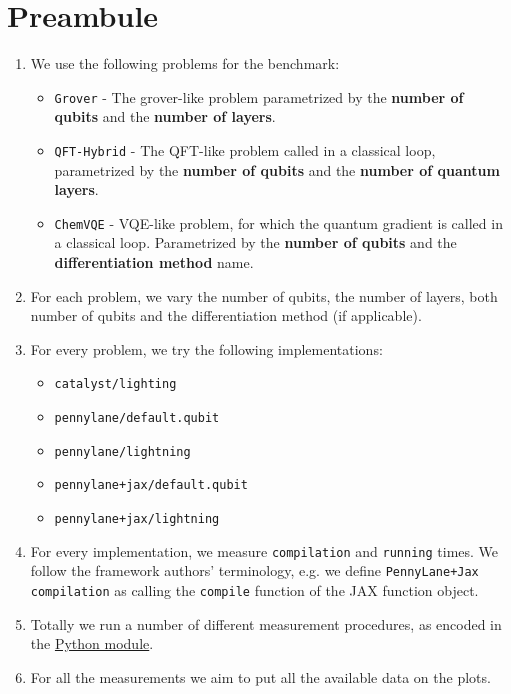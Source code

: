 \documentclass{article}
\renewcommand{\t}[1]{\texttt{#1}}
\begin{document}
\tableofcontents

\section{Preambule}

\begin{enumerate}
    \item We use the following problems for the benchmark:
        \begin{itemize}
            \item \t{Grover} - The grover-like problem parametrized by the \textbf{number of qubits} and the
                \textbf{number of layers}.
            \item \t{QFT-Hybrid} - The QFT-like problem called in a classical loop, parametrized by
                the \textbf{number of qubits} and the \textbf{number of quantum layers}.
            \item \t{ChemVQE} - VQE-like problem, for which the quantum gradient is called in a
                classical loop. Parametrized by the \textbf{number of qubits} and the
                \textbf{differentiation method} name.
        \end{itemize}
    \item For each problem, we vary the number of qubits, the number of layers, both
        number of qubits and the differentiation method (if applicable).
    \item For every problem, we try the following implementations:
        \begin{itemize}
            \item \t{catalyst/lighting}
            \item \t{pennylane/default.qubit}
            \item \t{pennylane/lightning}
            \item \t{pennylane+jax/default.qubit}
            \item \t{pennylane+jax/lightning}
        \end{itemize}
    \item For every implementation, we measure \t{compilation} and \t{running} times. We follow the
    framework authors' terminology, e.g. we define \t{PennyLane+Jax compilation} as calling the
    \t{compile} function of the JAX function object.

    \item Totally we run a number of different measurement procedures, as encoded in the
    \href{https://github.com/XanaduAI/pennylane-mlir/blob/benchmarking-1-2/benchmark/catalyst_benchmark/main.py#L84}{Python module}.

    \item For all the measurements we aim to put all the available data on the plots.
\end{enumerate}
\end{document}
